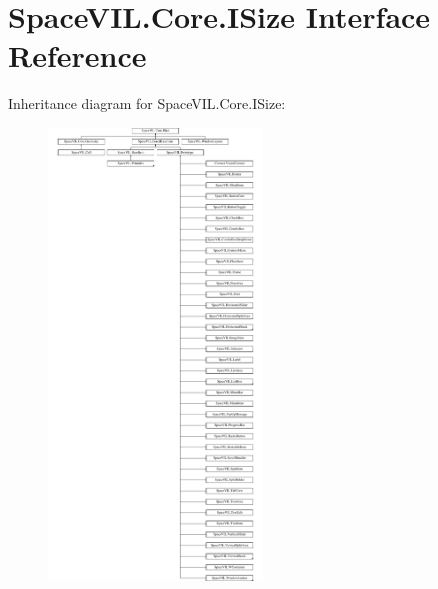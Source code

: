 \hypertarget{interface_space_v_i_l_1_1_core_1_1_i_size}{}\section{Space\+V\+I\+L.\+Core.\+I\+Size Interface Reference}
\label{interface_space_v_i_l_1_1_core_1_1_i_size}
Inheritance diagram for Space\+V\+I\+L.\+Core.\+I\+Size\+:\begin{figure}[H]
\begin{center}
\leavevmode
\includegraphics[height=12.000000cm]{interface_space_v_i_l_1_1_core_1_1_i_size}
\end{center}
\end{figure}
